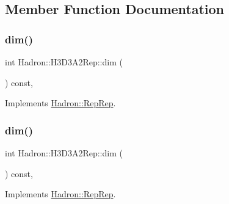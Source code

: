 \subsection{Member Function Documentation}
\mbox{\label{structHadron_1_1H3D3A2Rep_ab7b4c300c476b1e9771638ef5eee9e7e}} 
\subsubsection{\texorpdfstring{dim()}{dim()}\hspace{0.1cm}{\footnotesize\ttfamily [1/5]}}
{\footnotesize\ttfamily int Hadron\+::\+H3\+D3\+A2\+Rep\+::dim (\begin{DoxyParamCaption}{ }\end{DoxyParamCaption}) const\hspace{0.3cm}{\ttfamily [inline]}, {\ttfamily [virtual]}}



Implements \mbox{\hyperlink{structHadron_1_1RepRep_a92c8802e5ed7afd7da43ccfd5b7cd92b}{Hadron\+::\+Rep\+Rep}}.

\mbox{\label{structHadron_1_1H3D3A2Rep_ab7b4c300c476b1e9771638ef5eee9e7e}} 
\subsubsection{\texorpdfstring{dim()}{dim()}\hspace{0.1cm}{\footnotesize\ttfamily [2/5]}}
{\footnotesize\ttfamily int Hadron\+::\+H3\+D3\+A2\+Rep\+::dim (\begin{DoxyParamCaption}{ }\end{DoxyParamCaption}) const\hspace{0.3cm}{\ttfamily [inline]}, {\ttfamily [virtual]}}



Implements \mbox{\hyperlink{structHadron_1_1RepRep_a92c8802e5ed7afd7da43ccfd5b7cd92b}{Hadron\+::\+Rep\+Rep}}.

\mbox{\label{structHadron_1_1H3D3A2Rep_ab7b4c300c476b1e9771638ef5eee9e7e}} 
